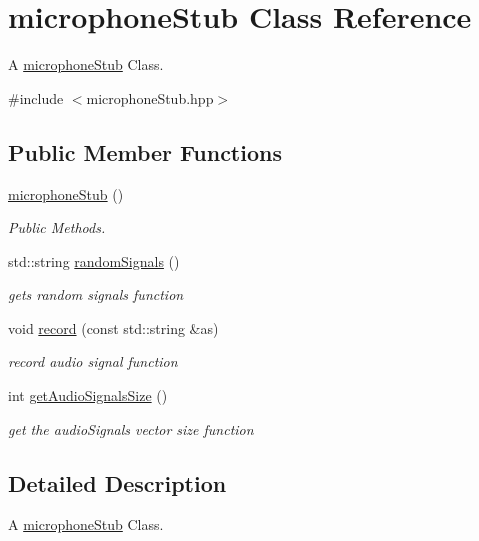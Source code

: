 \hypertarget{classmicrophoneStub}{}\section{microphone\+Stub Class Reference}
\label{classmicrophoneStub}


A \hyperlink{classmicrophoneStub}{microphone\+Stub} Class.  




{\ttfamily \#include $<$microphone\+Stub.\+hpp$>$}

\subsection*{Public Member Functions}
\begin{DoxyCompactItemize}
\item 
\hyperlink{classmicrophoneStub_ad6c399ca44d9ea353b7eadb3bb0643b8}{microphone\+Stub} ()
\begin{DoxyCompactList}\small\item\em Public Methods. \end{DoxyCompactList}\item 
std\+::string \hyperlink{classmicrophoneStub_a079f401be5f47197b055a1525861bbcb}{random\+Signals} ()
\begin{DoxyCompactList}\small\item\em gets random signals function \end{DoxyCompactList}\item 
void \hyperlink{classmicrophoneStub_ac84c5d23b4ab445c4e9ea56e2fbe6afe}{record} (const std\+::string \&as)
\begin{DoxyCompactList}\small\item\em record audio signal function \end{DoxyCompactList}\item 
int \hyperlink{classmicrophoneStub_ac46a405a50e0fd8f8bd2909ec25d178d}{get\+Audio\+Signals\+Size} ()
\begin{DoxyCompactList}\small\item\em get the audio\+Signals vector size function \end{DoxyCompactList}\end{DoxyCompactItemize}


\subsection{Detailed Description}
A \hyperlink{classmicrophoneStub}{microphone\+Stub} Class. 

